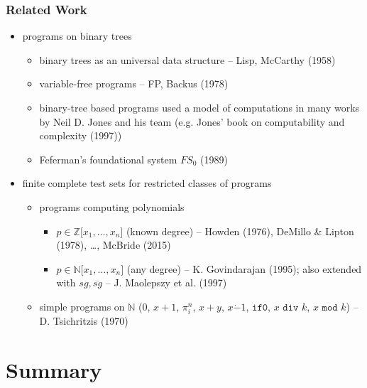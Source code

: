 \documentclass{beamer}
\begin{document}
\begin{frame}
  \frametitle{Related Work}
  \begin{itemize}
    \item programs on binary trees
	  \begin{itemize}
	    \item binary trees as an universal data structure -- Lisp, McCarthy (1958)
	    \item variable-free programs -- FP, Backus (1978)
	    \item binary-tree based programs used a model of computations in 
	      many works by Neil D. Jones and his team (e.g. Jones' book 
	      on computability and complexity (1997))
	    \item Feferman's foundational system $FS_0$ (1989)
	  \end{itemize}
	\item finite complete test sets for restricted classes of programs
	  \begin{itemize}
	    \item programs computing polynomials
	      \begin{itemize}
	        \item $p \in \mathbb{Z}\lbrack x_1, \ldots, x_n\rbrack$ (known degree) --
	          Howden (1976), DeMillo \& Lipton (1978), \ldots, McBride (2015)
	        \item $p \in \mathbb{N}\lbrack x_1, \ldots, x_n\rbrack$ (any degree) --
	          K. Govindarajan (1995); 
	          also extended with $\mathit{sg}, \overline{\mathit{sg}}$ --
	          J. Maolepszy et al. (1997)
	      \end{itemize}
	    \item simple programs on $\mathbb{N}$ 
	      ($0$, $x+1$, $\pi^n_i$, $x+y$, $x\dot{-}1$, $\texttt{if0}$, $x \texttt{ div } k$, $x \texttt{ mod } k$)
	      -- D. Tsichritzis (1970)
	  \end{itemize}
  \end{itemize}
\end{frame}

\section*{Summary}
\end{document}
